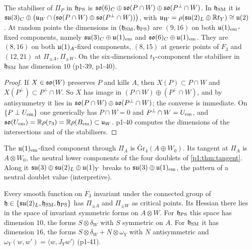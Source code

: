 \begin{proposition}
\label{p1:prop:strata}
The stabiliser of $\Pi_P$ in $\mathfrak h_{\rm PS}$ is $\mathfrak{so}(6)_C\oplus\mathfrak{so}(P\cap W)\oplus\mathfrak{so}(P^\perp\cap W)$. In $\mathfrak h_{\rm SM}$ it is
$\mathfrak{su}(3)_C\oplus\bigl(\mathfrak u_W\cap(\mathfrak{so}(P\cap W)\oplus\mathfrak{so}(P^\perp\cap W))\bigr)$, with $\mathfrak u_W=\rho(\mathfrak{su}(2)_L\oplus\mathbb{R} t_Y)\cong\mathfrak{u}(2)$. At random points the dimensions in
$(\mathfrak h_{\rm SM},\mathfrak h_{\rm PS})$ are $(9,16)$ on both $\mathfrak{u}(1)_{\rm em}$-fixed components, namely $\mathfrak{su}(3)_C\oplus\mathfrak{u}(1)_{\rm em}$ and $\mathfrak{so}(6)_C\oplus\mathfrak{u}(1)_{\rm em}$. They are
$(8,16)$ on both $\mathfrak{u}(1)_A$-fixed components, $(8,15)$ at generic points of $F_3$ and $(12,21)$ at $\Pi_{\pm A},\Pi_{\pm W}$. On the six-dimensional
$t_Y$-component the stabiliser in $\mathfrak h_{\rm SM}$ has dimension $10$ (p1-39, p1-40).
\end{proposition}

\begin{proof}
If $X\in\mathfrak{so}(W)$ preserves $P$ and kills $A$, then $X(P)\subset P\cap W$ and $X(P^\perp)\subset P^\perp\cap W$. So $X$ has image in $(P\cap W)\oplus(P^\perp\cap W)$, and by
antisymmetry it lies in $\mathfrak{so}(P\cap W)\oplus\mathfrak{so}(P^\perp\cap W)$; the converse is immediate. On $\{P\perp U_{\rm em}\}$ one generically has $P\cap W=0$ and
$P^\perp\cap W=U_{\rm em}$, and $\mathfrak{so}(U_{\rm em})=\mathbb{R}\rho(\tau_3)=\mathbb{R}\rho(B_{\rm em})\subset\mathfrak u_W$. p1-40 computes the dimensions of the intersections and of the stabilisers.
\end{proof}

The $\mathfrak{u}(1)_{\rm em}$-fixed component through $\Pi_A$ is $\widetilde{\mathrm{Gr}}_4(A\oplus W_0)$. Its tangent at $\Pi_A$ is $A\otimes W_0$, the neutral lower components of the four
doublets of \cref{p1:thm:tangent}. Along it $\mathfrak{su}(3)\oplus\mathfrak{su}(2)_L\oplus\mathfrak{u}(1)_Y$ breaks to $\mathfrak{su}(3)\oplus\mathfrak{u}(1)_{\rm em}$, the pattern of a neutral doublet value (interpretive).

\begin{corollary}
\label{p1:cor:critical}
Every smooth function on $F_3$ invariant under the connected group of $\mathfrak h\in\{\mathfrak{su}(2)_L,\mathfrak h_{\rm SM},\mathfrak h_{\rm PS}\}$ has $\Pi_{\pm A}$ and $\Pi_{\pm W}$ as
critical points. Its Hessian there lies in the space of invariant symmetric forms on $A\otimes W$. For $\mathfrak h_{\rm PS}$ this space has dimension $10$, the forms
$S\otimes\delta_W$ with $S$ symmetric on $A$. For $\mathfrak h_{\rm SM}$ it has dimension $16$, the forms $S\otimes\delta_W+N\otimes\omega_Y$ with $N$ antisymmetric and
$\omega_Y(w,w')=\langle w,J_Yw'\rangle$ (p1-41).
\end{corollary}

